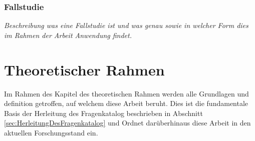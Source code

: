 \documentclass[11pt,a4paper,hidelinks]{article}   %
\begin{document}
            \subsubsection{Fallstudie}
                \emph{Beschreibung was eine Fallstudie ist und was genau sowie in welcher Form dies im Rahmen der Arbeit Anwendung findet.}

    
    \newpage
    \section{Theoretischer Rahmen}
        Im Rahmen des Kapitel des theoretischen Rahmen werden alle Grundlagen und definition getroffen, auf welchem diese Arbeit beruht. Dies ist die fundamentale Basis der Herleitung des Fragenkatalog beschrieben in Abschnitt \ref{sec:HerleitungDesFragenkatalog} und Ordnet darüberhinaus diese Arbeit in den aktuellen Forschungsstand ein.
\end{document}
